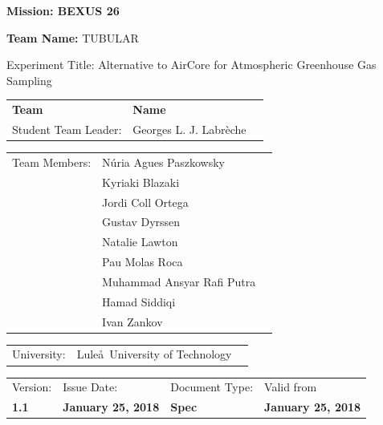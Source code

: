 \documentclass[a4paper,12pt,twoside]{article}
\begin{document}
\begin{flushleft}
\vspace{5pt}

\noindent \textbf{\hspace{-1pt}Mission: BEXUS 26} \\

\vspace{20pt}

{\hspace{-2pt}\noindent \Large{\textbf{Team Name:} } TUBULAR} \\

\vspace{20pt}

\hspace{-1pt}Experiment Title: Alternative to AirCore for Atmospheric Greenhouse Gas Sampling\\

\vspace{20pt}
\begin{tabular}{p{} p{} p{}}
\textbf{Team} & \textbf{Name}  \\
Student Team Leader:  &  Georges L. J. Labr\`{e}che \\
\end{tabular}
\vspace{5pt}
\begin{tabular}{p{} p{} p{}}
Team Members:  & N\'{u}ria Agues Paszkowsky \\
& Kyriaki Blazaki \\
& Jordi Coll Ortega \\
& Gustav Dyrssen \\
& Natalie Lawton \\
& Pau Molas Roca \\
& Muhammad Ansyar Rafi Putra \\
& Hamad Siddiqi \\
& Ivan Zankov \\
\end{tabular}
\begin{tabular}{p{} p{} p{}}
University: & Lule\aa \ University of Technology
\end{tabular}

\vspace{0.5cm} 


 \begin{tabular}{p{} p{} p{} p{}}
\footnotesize{Version:}     & \footnotesize{Issue Date:} & \footnotesize{Document Type:} & \footnotesize{Valid from} \\
\textbf{1.1}          & \textbf{January 25, 2018}    & \textbf{Spec}   & \textbf{January 25, 2018} \\ 
\end{tabular}


\end{flushleft}
\end{document}
